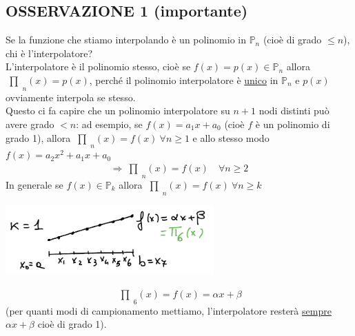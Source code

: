 \documentclass[12pt,headings=optiontohead]{article}
\newcommand{\inter}{\begin{matrix}\prod\end{matrix}}
\begin{document}
\subsection{OSSERVAZIONE 1 (importante)}
Se la funzione che stiamo interpolando è un polinomio in $\mathbb{P}_n$ (cioè di grado $\leq n$), chi è l'interpolatore?\\
L'interpolatore è il polinomio stesso, cioè se $f(x) = p(x) \in \mathbb{P}_n$ allora $\inter_n(x) = p(x)$, perché il polinomio interpolatore è \uline{unico} in $\mathbb{P}_n$ e
$p(x)$ ovviamente interpola se stesso.\\
Questo ci fa capire che un polinomio interpolatore su $n+1$ nodi distinti può avere grado $<n$: ad esempio, se $f(x) = a_1x + a_0$ (cioè $f$ è un polinomio di grado 1), allora $\inter_n(x) = f(x) \ \forall n \ge 1$ e allo stesso modo $f(x) = a_2x^2 + a_1x + a_0$
\[\Longrightarrow \inter_n(x) = f(x) \quad \forall n \ge 2\]
In generale se $f(x) \in \mathbb{P}_k$ allora $\inter_n(x) = f(x) \ \forall n \ge k$
\begin{center}
    \includegraphics[width=0.6\textwidth]{lez12_img2.png}
\end{center}
\[\inter_6(x) = f(x) = \alpha x + \beta\]
(per quanti modi di campionamento mettiamo, l'interpolatore resterà \uline{sempre} $\alpha x + \beta$ cioè di grado 1).
\end{document}

